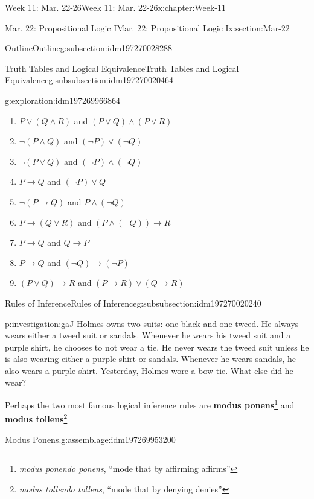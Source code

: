 \documentclass[oneside,10pt,]{book}
\newcommand{\tabularfont}{\relax}
\newcommand{\terminology}[1]{\textbf{#1}}
\numberwithin{equation}{section}
\newcommand{\hrulethin}  {\noalign{\hrule height 0.04em}}
\def\imp{\to}
\newcommand{\imp}{\rightarrow}
\begin{document}
\begin{chapterptx}{Week 11: Mar. 22-26}{}{Week 11: Mar. 22-26}{}{}{x:chapter:Week-11}
\begin{sectionptx}{Mar. 22: Propositional Logic I}{}{Mar. 22: Propositional Logic I}{}{}{x:section:Mar-22}
\begin{subsectionptx}{Outline}{}{Outline}{}{}{g:subsection:idm197270028288}
\begin{subsubsectionptx}{Truth Tables and Logical Equivalence}{}{Truth Tables and Logical Equivalence}{}{}{g:subsubsection:idm197270020464}
\begin{exploration}{}{g:exploration:idm197269966864}
\begin{enumerate}
\item{}\(P\lor (Q\land R)\) and \((P\lor Q) \land (P\lor R)\)%
\item{}\(\neg(P\land Q)\) and \((\neg P) \lor (\neg Q)\)%
\item{}\(\neg(P\lor Q)\) and \((\neg P) \land (\neg Q)\)%
\item{}\(P\imp Q\) and \((\neg P) \lor Q\)%
\item{}\(\neg (P\imp Q)\) and \(P\land (\neg Q)\)%
\item{}\(P\imp (Q\lor R)\) and \((P\land (\neg Q))\imp R\)%
\item{}\(P\imp Q\) and \(Q\imp P\)%
\item{}\(P\imp Q\) and \((\neg Q)\imp (\neg P)\)%
\item{}\((P\lor Q)\imp R\) and \((P\imp R)\lor (Q\imp R)\)%
\end{enumerate}
\end{exploration}%
\end{subsubsectionptx}
%
%
\typeout{************************************************}
\typeout{************************************************}
%
\begin{subsubsectionptx}{Rules of Inference}{}{Rules of Inference}{}{}{g:subsubsection:idm197270020240}
\begin{investigation}{}{p:investigation:gaJ}%
Holmes owns two suits: one black and one tweed. He always wears either a tweed suit or sandals. Whenever he wears his tweed suit and a purple shirt, he chooses to not wear a tie. He never wears the tweed suit unless he is also wearing either a purple shirt or sandals. Whenever he wears sandals, he also wears a purple shirt. Yesterday, Holmes wore a bow tie. What else did he wear?%
\end{investigation}%
Perhaps the two most famous logical inference rules are \terminology{modus ponens}\footnote{\emph{modus ponendo ponens}, ``mode that by affirming affirms''\label{g:fn:idm197269955408}} and \terminology{modus tollens}\footnote{\emph{modus tollendo tollens}, ``mode that by denying denies''\label{g:fn:idm197269954176}}%
\begin{assemblage}{Modus Ponens.}{g:assemblage:idm197269953200}%
\begin{sidebyside}{1}{0}{0}{0}%
\begin{sbspanel}{1}%
\resizebox{\linewidth}{!}{%
{\centering%
{\tabularfont%
\begin{tabular}{cc}
&\(P \imp Q\)\tabularnewline[0pt]
&\(P\)\tabularnewline\hrulethin

\end{tabular}}}}
\end{sbspanel}
\end{sidebyside}
\end{assemblage}
\end{subsubsectionptx}
\end{subsectionptx}
\end{sectionptx}
\end{chapterptx}
\end{document}
